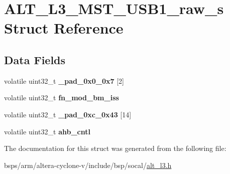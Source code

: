 \hypertarget{structALT__L3__MST__USB1__raw__s}{}\section{A\+L\+T\+\_\+\+L3\+\_\+\+M\+S\+T\+\_\+\+U\+S\+B1\+\_\+raw\+\_\+s Struct Reference}
\label{structALT__L3__MST__USB1__raw__s}
\subsection*{Data Fields}
\begin{DoxyCompactItemize}
\item 
\mbox{\label{structALT__L3__MST__USB1__raw__s_a65b576b061e310541a50d2d0fa6a7ee7}} 
volatile uint32\+\_\+t {\bfseries \+\_\+pad\+\_\+0x0\+\_\+0x7} \mbox{[}2\mbox{]}
\item 
\mbox{\label{structALT__L3__MST__USB1__raw__s_afae564c12688688acb536c15e43d6c0a}} 
volatile uint32\+\_\+t {\bfseries fn\+\_\+mod\+\_\+bm\+\_\+iss}
\item 
\mbox{\label{structALT__L3__MST__USB1__raw__s_afe8dec27e6ba7e7396fa4e7b7894a457}} 
volatile uint32\+\_\+t {\bfseries \+\_\+pad\+\_\+0xc\+\_\+0x43} \mbox{[}14\mbox{]}
\item 
\mbox{\label{structALT__L3__MST__USB1__raw__s_a9f0aa7576a46ea27e4241cad2b2cc190}} 
volatile uint32\+\_\+t {\bfseries ahb\+\_\+cntl}
\end{DoxyCompactItemize}


The documentation for this struct was generated from the following file\+:\begin{DoxyCompactItemize}
\item 
bsps/arm/altera-\/cyclone-\/v/include/bsp/socal/\mbox{\hyperlink{alt__l3_8h}{alt\+\_\+l3.\+h}}\end{DoxyCompactItemize}
